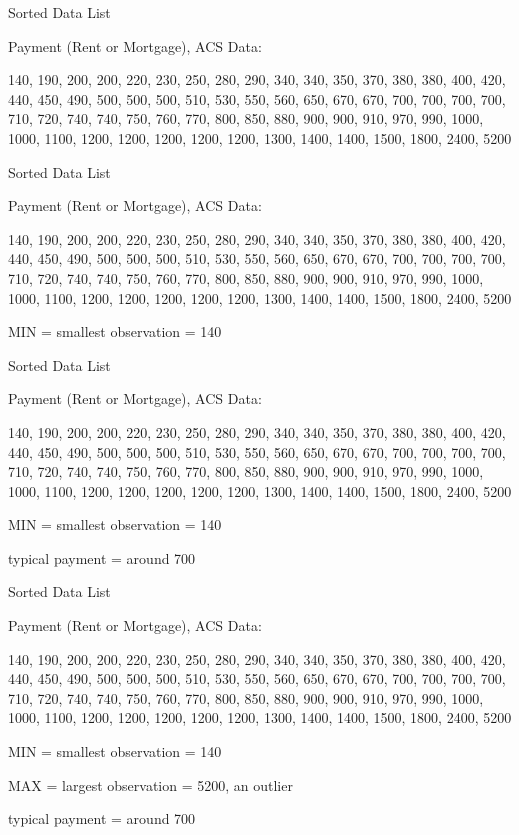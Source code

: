 \documentclass[14pt]{beamer}\usepackage[]{graphicx}\usepackage[]{color}
\begin{document}
\begin{frame}[fragile]{Sorted Data List}

Payment (Rent or Mortgage), ACS Data:



140, 190, 200, 200, 220, 230, 250, 280, 290, 340, 340, 350, 370, 380, 380, 400, 420, 440, 450, 490, 500, 500, 500, 510, 530, 550, 560, 650, 670, 670, 700, 700, 700, 700, 710, 720, 740, 740, 750, 760, 770, 800, 850, 880, 900, 900, 910, 970, 990, 1000, 1000, 1100, 1200, 1200, 1200, 1200, 1200, 1300, 1400, 1400, 1500, 1800, 2400, 5200

\end{frame}

\begin{frame}[fragile]{Sorted Data List}

Payment (Rent or Mortgage), ACS Data:

140, 190, 200, 200, 220, 230, 250, 280, 290, 340, 340, 350, 370, 380, 380, 400, 420, 440, 450, 490, 500, 500, 500, 510, 530, 550, 560, 650, 670, 670, 700, 700, 700, 700, 710, 720, 740, 740, 750, 760, 770, 800, 850, 880, 900, 900, 910, 970, 990, 1000, 1000, 1100, 1200, 1200, 1200, 1200, 1200, 1300, 1400, 1400, 1500, 1800, 2400, 5200

MIN = smallest observation = 140 
\end{frame}

\begin{frame}[fragile]{Sorted Data List}

Payment (Rent or Mortgage), ACS Data:

140, 190, 200, 200, 220, 230, 250, 280, 290, 340, 340, 350, 370, 380, 380, 400, 420, 440, 450, 490, 500, 500, 500, 510, 530, 550, 560, 650, 670, 670, 700, 700, 700, 700, 710, 720, 740, 740, 750, 760, 770, 800, 850, 880, 900, 900, 910, 970, 990, 1000, 1000, 1100, 1200, 1200, 1200, 1200, 1200, 1300, 1400, 1400, 1500, 1800, 2400, 5200

MIN = smallest observation = 140 

typical payment = around 700

\end{frame}

\begin{frame}[fragile]{Sorted Data List}

Payment (Rent or Mortgage), ACS Data:

140, 190, 200, 200, 220, 230, 250, 280, 290, 340, 340, 350, 370, 380, 380, 400, 420, 440, 450, 490, 500, 500, 500, 510, 530, 550, 560, 650, 670, 670, 700, 700, 700, 700, 710, 720, 740, 740, 750, 760, 770, 800, 850, 880, 900, 900, 910, 970, 990, 1000, 1000, 1100, 1200, 1200, 1200, 1200, 1200, 1300, 1400, 1400, 1500, 1800, 2400, 5200

MIN = smallest observation = 140 

MAX = largest observation = 5200, an outlier  

typical payment = around 700

\end{frame}
\end{document}
